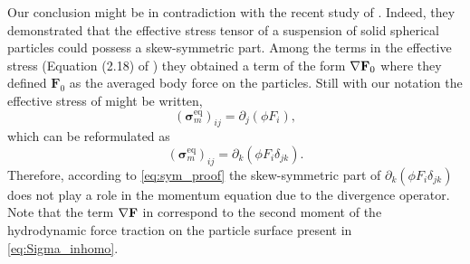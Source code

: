 Our conclusion might be in contradiction with the recent study of \cite{wolgemuth2023continuum}.
Indeed, they demonstrated that the effective stress tensor of a suspension of solid spherical particles could possess a skew-symmetric part. 
Among the terms in the effective stress (Equation (2.18) of \cite{wolgemuth2023continuum}) they obtained a term of the form $\mathbf{\nabla} \textbf{F}_0$ where they defined $\textbf{F}_0$ as the averaged body force on the particles. 
Still with our notation the effective stress of \citet{wolgemuth2023continuum} might be written, 
\begin{equation*}
    (\bm\sigma^\text{eq}_m)_{ij}
    = \partial_j(\phi F_i),
\end{equation*}
which can be reformulated as 
\begin{equation*}
    (\bm\sigma^\text{eq}_m)_{ij}
    = \partial_k(\phi F_i \delta_{jk}). 
\end{equation*}
Therefore, according to \ref{eq:sym_proof} the skew-symmetric part of $\partial_k(\phi F_i \delta_{jk})$ does not play a role in the momentum equation due to the divergence operator. 
Note that the term $\mathbf{\nabla} \textbf{F}$ in \citet{wolgemuth2023continuum} correspond to the second moment of the hydrodynamic force traction on the particle surface present in \ref{eq:Sigma_inhomo}. 


